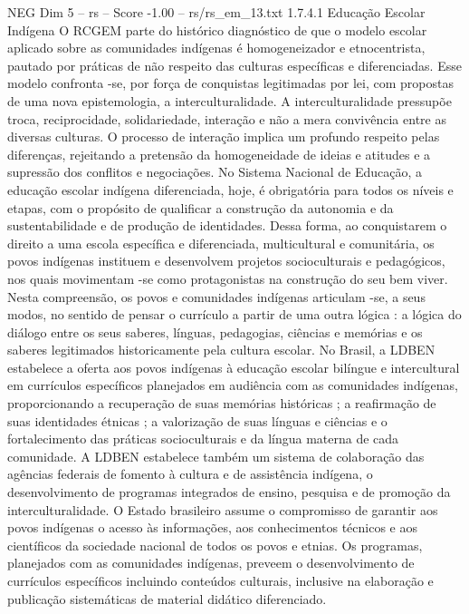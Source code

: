 \begin{textsample}{NEG Dim 5 – rs – Score -1.00 – rs/rs\_em\_13.txt}  \label{ex:f5_neg_027}
1.7.4.1 Educação Escolar Indígena O RCGEM parte do histórico diagnóstico de que o modelo escolar aplicado sobre as comunidades indígenas é homogeneizador e etnocentrista, pautado por práticas de não respeito das culturas específicas e diferenciadas.
Esse modelo confronta -se, por força de conquistas legitimadas por lei, com propostas de uma nova epistemologia, a interculturalidade.
A interculturalidade pressupõe troca, reciprocidade, solidariedade, interação e não a mera convivência entre as diversas culturas.
O processo de interação implica um profundo respeito pelas diferenças, rejeitando a pretensão da homogeneidade de ideias e atitudes e a supressão dos conflitos e negociações.
No Sistema Nacional de Educação, a educação escolar indígena diferenciada, hoje, é obrigatória para todos os níveis e etapas, com o propósito de qualificar a construção da autonomia e da sustentabilidade e de produção de identidades.
Dessa forma, ao conquistarem o direito a uma escola específica e diferenciada, multicultural e comunitária, os povos indígenas instituem e desenvolvem projetos socioculturais e pedagógicos, nos quais movimentam -se como protagonistas na construção do seu bem viver.
Nesta compreensão, os povos e comunidades indígenas articulam -se, a seus modos, no sentido de pensar o currículo a partir de uma outra lógica : a lógica do diálogo entre os seus saberes, línguas, pedagogias, ciências e memórias e os saberes legitimados historicamente pela cultura escolar.
No Brasil, a LDBEN estabelece a oferta aos povos indígenas à educação escolar bilíngue e intercultural em currículos específicos planejados em audiência com as comunidades indígenas, proporcionando a recuperação de suas memórias históricas ; a reafirmação de suas identidades étnicas ; a valorização de suas línguas e ciências e o fortalecimento das práticas socioculturais e da língua materna de cada comunidade.
A LDBEN estabelece também um sistema de colaboração das agências federais de fomento à cultura e de assistência indígena, o desenvolvimento de programas integrados de ensino, pesquisa e de promoção da interculturalidade.
O Estado brasileiro assume o compromisso de garantir aos povos indígenas o acesso às informações, aos conhecimentos técnicos e aos científicos da sociedade nacional de todos os povos e etnias.
Os programas, planejados com as comunidades indígenas, preveem o desenvolvimento de currículos específicos incluindo conteúdos culturais, inclusive na elaboração e publicação sistemáticas de material didático diferenciado.

\end{textsample}
